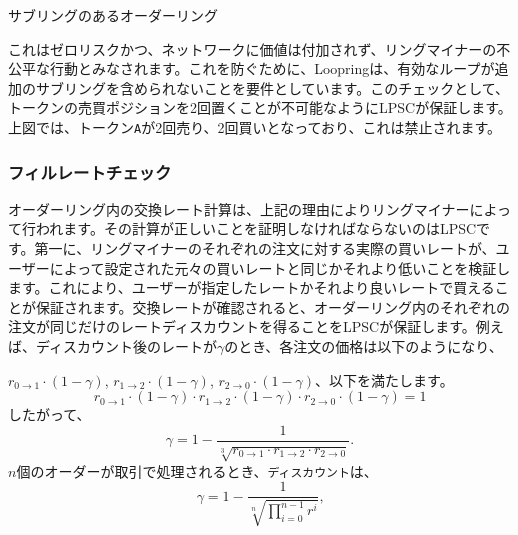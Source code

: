\documentclass{article}
\makeatletter
\newenvironment{figurehere}
 {\def\@captype{figure}}
 {}
\makeatother
\begin{document}
\begin{multicols}{2}
\begin{center}
\begin{figurehere}

\caption{サブリングのあるオーダーリング}
\label{fig:subring}
\end{figurehere}
\end{center}

これはゼロリスクかつ、ネットワークに価値は付加されず、リングマイナーの不公平な行動とみなされます。これを防ぐために、Loopringは、有効なループが追加のサブリングを含められないことを要件としています。このチェックとして、トークンの売買ポジションを2回置くことが不可能なようにLPSCが保証します。上図では、トークン\verb|A|が2回売り、2回買いとなっており、これは禁止されます。


\subsubsection{フィルレートチェック\label{sec:fill_rate_check}}


オーダーリング内の交換レート計算は、上記の理由によりリングマイナーによって行われます。その計算が正しいことを証明しなければならないのはLPSCです。第一に、リングマイナーのそれぞれの注文に対する実際の買いレートが、ユーザーによって設定された元々の買いレートと同じかそれより低いことを検証します。これにより、ユーザーが指定したレートかそれより良いレートで買えることが保証されます。交換レートが確認されると、オーダーリング内のそれぞれの注文が同じだけのレートディスカウントを得ることをLPSCが保証します。例えば、ディスカウント後のレートが$\gamma$のとき、各注文の価格は以下のようになり、

$r_{0\rightarrow 1} \cdot (1-\gamma)$, $r_{1\rightarrow 2} \cdot (1-\gamma)$, $r_{2 \rightarrow 0} \cdot (1-\gamma)$、以下を満たします。 
\begin{equation}
r_{0\rightarrow 1} \cdot (1-\gamma)\cdot r_{1\rightarrow 2} \cdot (1-\gamma) \cdot r_{2 \rightarrow 0} \cdot (1-\gamma) = 1
\end{equation}
したがって、 
\begin{equation}
\gamma = 1- \frac{1}{\sqrt[3]{r_{0\rightarrow 1} \cdot r_{1\rightarrow 2} \cdot r_{2\rightarrow 0}}}\text{.}
\end{equation}
$n$個のオーダーが取引で処理されるとき、\texttt{ディスカウント}は、  
\begin{equation}
\gamma = 1- \frac{1}{\sqrt[n]{\prod_{i=0}^{n-1} r^i}} \text{,}
\end{equation}


\end{multicols}
\end{document}
